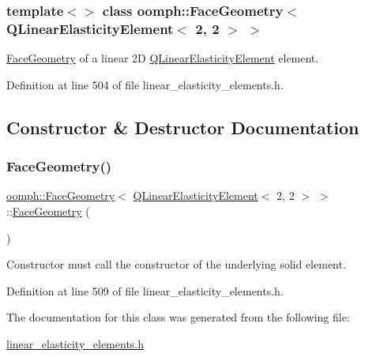 \subsubsection*{template$<$$>$\newline
class oomph\+::\+Face\+Geometry$<$ Q\+Linear\+Elasticity\+Element$<$ 2, 2 $>$ $>$}

\hyperlink{classoomph_1_1FaceGeometry}{Face\+Geometry} of a linear 2D \hyperlink{classoomph_1_1QLinearElasticityElement}{Q\+Linear\+Elasticity\+Element} element. 

Definition at line 504 of file linear\+\_\+elasticity\+\_\+elements.\+h.



\subsection{Constructor \& Destructor Documentation}
\mbox{\label{classoomph_1_1FaceGeometry_3_01QLinearElasticityElement_3_012_00_012_01_4_01_4_ab8f1f093312b67aa7aa0777828fc6802}} 
\subsubsection{\texorpdfstring{Face\+Geometry()}{FaceGeometry()}}
{\footnotesize\ttfamily \hyperlink{classoomph_1_1FaceGeometry}{oomph\+::\+Face\+Geometry}$<$ \hyperlink{classoomph_1_1QLinearElasticityElement}{Q\+Linear\+Elasticity\+Element}$<$ 2, 2 $>$ $>$\+::\hyperlink{classoomph_1_1FaceGeometry}{Face\+Geometry} (\begin{DoxyParamCaption}{ }\end{DoxyParamCaption})\hspace{0.3cm}{\ttfamily [inline]}}



Constructor must call the constructor of the underlying solid element. 



Definition at line 509 of file linear\+\_\+elasticity\+\_\+elements.\+h.



The documentation for this class was generated from the following file\+:\begin{DoxyCompactItemize}
\item 
\hyperlink{linear__elasticity__elements_8h}{linear\+\_\+elasticity\+\_\+elements.\+h}\end{DoxyCompactItemize}
